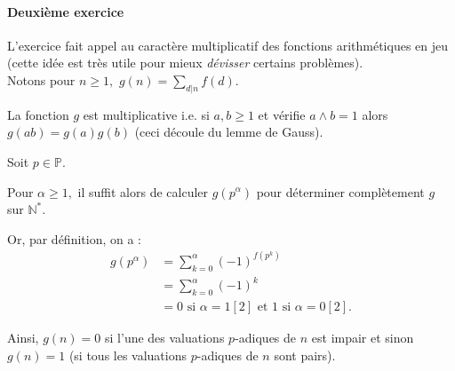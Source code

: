 \paragraph{Deuxième exercice}

L'exercice fait appel au caractère multiplicatif des fonctions arithmétiques en jeu (cette idée est très utile pour mieux \emph{dévisser} certains problèmes).\\

Notons pour $n\geq 1,$ $\displaystyle g(n)=\sum_{d|n}f(d).$ 

La fonction $g$ est multiplicative i.e. si $a,b\geq 1$ et vérifie $a\wedge b=1$ alors $\displaystyle g(ab)=g(a)g(b)$ (ceci découle du lemme de Gauss).

Soit $p\in \mathbb{P}.$ 

Pour $\alpha\geq 1,$ il suffit alors de calculer $g(p^{\alpha})$ pour déterminer complètement $g$ sur $\mathbb{N}^{*}.$

Or, par définition, on a :
\begin{align*}
g(p^{\alpha}) & =\sum_{k=0}^{\alpha}(-1)^{f(p^{k})}\\
& =\sum_{k=0}^{\alpha}(-1)^{k}\\
& =0 \mbox{ si } \alpha=1 [2] \mbox{ et } 1 \mbox{ si } \alpha=0 [2].
\end{align*}

Ainsi, $g(n)=0$ si l'une des valuations $p$-adiques de $n$ est impair et sinon $g(n)=1$ (si tous les valuations $p$-adiques de $n$ sont pairs).

